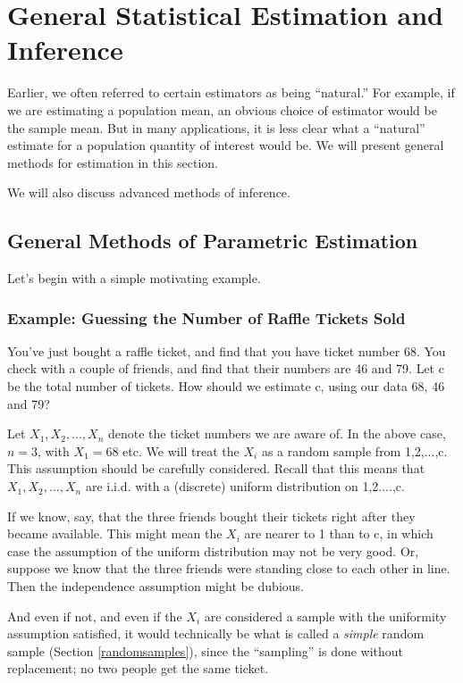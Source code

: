 \chapter{General Statistical Estimation and Inference}
\label{chap:est} 

Earlier, we often referred to certain estimators as being ``natural.''
For example, if we are estimating a population mean, an obvious choice
of estimator would be the sample mean.  But in many applications, it is
less clear what a ``natural'' estimate for a population quantity of
interest would be.  We will present general methods for estimation in
this section.

We will also discuss advanced methods of inference.

\section{General Methods of Parametric Estimation}
\label{genest}

Let's begin with a simple motivating example.

\subsection{Example:  Guessing the Number of Raffle Tickets Sold}
\label{raffle}

You've just bought a raffle ticket, and find that you have ticket number
68.  You check with a couple of friends, and find that their numbers are
46 and 79.  Let c be the total number of tickets.  How should we
estimate c, using our data 68, 46 and 79?

Let $X_1,X_2,...,X_n$ denote the ticket numbers we are aware of.  In the
above case, $n = 3$, with $X_1 = 68$ etc.  We will treat the $X_i$ as a
random sample from 1,2,...,c.  This assumption should be carefully
considered.  Recall that this means that $X_1,X_2,...,X_n$ are i.i.d.
with a (discrete) uniform distribution on 1,2....,c.  

If we know, say, that the three friends bought their tickets right after
they became available.  This might mean the $X_i$ are nearer to 1 than
to c, in which case the assumption of the uniform distribution may not
be very good.  Or, suppose we know that the three friends were standing
close to each other in line.  Then the independence assumption might be
dubious.  

And even if not, and even if the $X_i$ are considered a sample with the
uniformity assumption satisfied, it would technically be what is called
a {\it simple} random sample (Section \ref{randomsamples}), since the
``sampling'' is done without replacement; no two people get the same
ticket.


